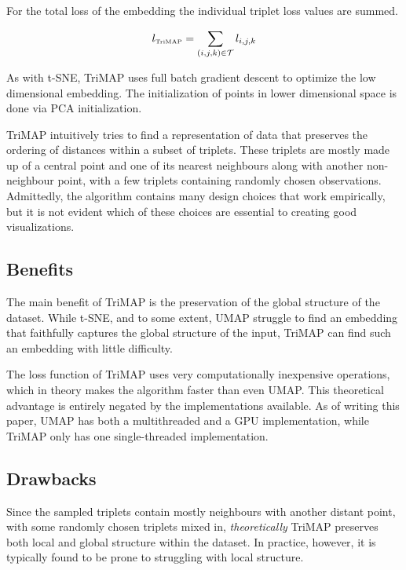 For the total loss of the embedding the individual triplet loss values are summed.

\begin{equation}
	l_{\text{\tiny TriMAP}} = \sum_{(i,j,k)\in\mathcal{T}}l_{i,j,k}
\end{equation}

As with t-SNE, TriMAP uses full batch gradient descent to optimize the low dimensional embedding. The initialization of points in lower dimensional space is done via PCA initialization.

TriMAP intuitively tries to find a representation of data that preserves the ordering of distances within a subset of triplets. These triplets are mostly made up of a central point and one of its nearest neighbours along with another non-neighbour point, with a few triplets containing randomly chosen observations. Admittedly, the algorithm contains many design choices that work empirically, but it is not evident which of these choices are essential to creating good visualizations.

\subsection{Benefits}

The main benefit of TriMAP is the preservation of the global structure of the dataset. While t-SNE, and to some extent, UMAP struggle to find an embedding that faithfully captures the global structure of the input, TriMAP can find such an embedding with little difficulty.

The loss function of TriMAP uses very computationally inexpensive operations, which in theory makes the algorithm faster than even UMAP. This theoretical advantage is entirely negated by the implementations available. As of writing this paper, UMAP has both a multithreaded and a GPU implementation, while TriMAP only has one single-threaded implementation.

\subsection{Drawbacks}

Since the sampled triplets contain mostly neighbours with another distant point, with some randomly chosen triplets mixed in, \textit{theoretically} TriMAP preserves both local and global structure within the dataset. In practice, however, it is typically found to be prone to struggling with local structure.

